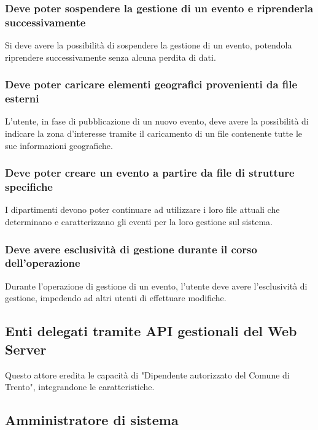 \documentclass{article}
\begin{document}
\subsubsection{Deve poter sospendere la gestione di un evento e riprenderla successivamente}
\label{5.3.7}
Si deve avere la possibilità di sospendere la gestione di un evento, potendola riprendere successivamente senza alcuna perdita di dati.

\subsubsection{Deve poter caricare elementi geografici provenienti da file esterni}
\label{5.3.8}
L'utente, in fase di pubblicazione di un nuovo evento, deve avere la possibilità di indicare la zona d'interesse tramite il caricamento di un file contenente tutte le sue informazioni geografiche.

\subsubsection{Deve poter creare un evento a partire da file di strutture specifiche}
\label{5.3.9}
I dipartimenti devono poter continuare ad utilizzare i loro file attuali che determinano e caratterizzano gli eventi per la loro gestione sul sistema.

\subsubsection{Deve avere esclusività di gestione durante il corso dell'operazione}
\label{5.3.10}
Durante l'operazione di gestione di un evento, l'utente deve avere l'esclusività di gestione, impedendo ad altri utenti di effettuare modifiche.

\subsection{Enti delegati tramite API gestionali del Web Server}
Questo attore eredita le capacità di "Dipendente autorizzato del Comune di Trento", integrandone le caratteristiche.

\subsection{Amministratore di sistema}
\label{5.4.1}
\end{document}
